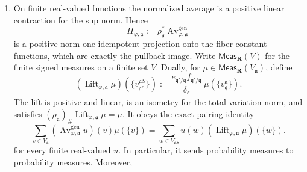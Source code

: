 \begin{theorem}
\begin{enumerate}
\[      \]
      Conversely, if the branch map is not surjective, pullback admits no
      left inverse even as a map of sets.  Thus branch surjectivity is the
      exact condition for a finite curve-link pullback to admit a
      pushforward retraction.  Extending the normalized average by the same
      formula to finite real-valued obstacles \(\psi\), one has
      \[
       \operatorname{Av}^{\mathrm{gen}}_{\varphi,\mathfrak a}
          (P^{\mathrm{id}}_{\mathfrak aS}\psi)
       \leq
       P^{\mathrm{id}}_{\mathfrak a}
          (\operatorname{Av}^{\mathrm{gen}}_{\varphi,\mathfrak a}\psi).
       \tag{\(\blacktriangle\blacktriangle\)}
       \label{eq:p126-curve-generic-average-envelope}
      \]
      Equality holds exactly when no fiber contains two points \(y,z\) with
      \(\psi(y)<0<\psi(z)\).
\item On finite real-valued functions the normalized average is a positive
      linear contraction for the sup norm.  Hence
      \[
       \Pi_{\varphi,\mathfrak a}
          :=\rho_{\mathfrak a}^*
             \operatorname{Av}^{\mathrm{gen}}_{\varphi,\mathfrak a}
       \tag{\(\circledast\)}
       \label{eq:p126-curve-generic-barycentric-projection}
      \]
      is a positive norm-one idempotent projection onto the fiber-constant
      functions, which are exactly the pullback image.  Write
      \(\mathsf{Meas}_{\mathbf R}(V)\) for the finite signed measures on a
      finite set \(V\).  Dually, for
      \(\mu\in\mathsf{Meas}_{\mathbf R}(V_{\mathfrak a})\), define
      \[
       (\operatorname{Lift}_{\varphi,\mathfrak a}\mu)
          (\{v_{\mathfrak q'}^{\mathfrak aS}\})
       :=\frac{e_{\mathfrak q'/\mathfrak q}
                    f_{\mathfrak q'/\mathfrak q}}
               {\delta_{\mathfrak q}}\,
          \mu(\{v_{\mathfrak q}^{\mathfrak a}\}).
       \tag{\(\circledcirc\)}
       \label{eq:p126-curve-generic-measure-lift}
      \]
      The lift is positive and linear, is an isometry for the total-variation
      norm, and satisfies
      \((\rho_{\mathfrak a})_\#
          \operatorname{Lift}_{\varphi,\mathfrak a}\mu=\mu\).  It obeys
      the exact pairing identity
      \[
       \sum_{v\in V_{\mathfrak a}}
          (\operatorname{Av}^{\mathrm{gen}}_{\varphi,\mathfrak a}u)(v)
          \mu(\{v\})
       =\sum_{w\in V_{\mathfrak aS}}
          u(w)(\operatorname{Lift}_{\varphi,\mathfrak a}\mu)(\{w\}).
       \tag{\(\bullet\)}
       \label{eq:p126-curve-generic-function-measure-pairing}
      \]
      for every finite real-valued \(u\).  In particular, it sends
      probability measures to probability measures.  Moreover,

\end{enumerate}
\end{theorem}
